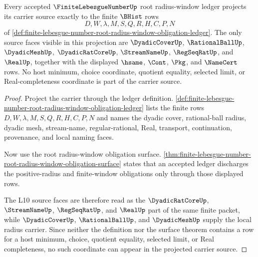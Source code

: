 \begin{theorem}
\label{thm:finite-lebesgue-number-radius-carrier-source}
Every accepted $\FiniteLebesgueNumberUp$ root radius-window ledger projects its carrier source exactly to the finite $\BHist$ rows
$$
D,W,\lambda,M,S,Q,R,H,C,P,N
$$
of \autoref{def:finite-lebesgue-number-root-radius-window-obligation-ledger}. The only source faces visible in this projection are $\DyadicCoverUp$, $\RationalBallUp$, $\DyadicMeshUp$, $\DyadicRatCoreUp$, $\StreamNameUp$, $\RegSeqRatUp$, and $\RealUp$, together with the displayed $\hsame$, $\Cont$, $\Pkg$, and $\NameCert$ rows. No host minimum, choice coordinate, quotient equality, selected limit, or Real-completeness coordinate is part of the carrier source.
\end{theorem}
\begin{proof}
Project the carrier through the ledger definition. \autoref{def:finite-lebesgue-number-root-radius-window-obligation-ledger} lists the finite rows $D,W,\lambda,M,S,Q,R,H,C,P,N$ and names the dyadic cover, rational-ball radius, dyadic mesh, stream-name, regular-rational, Real, transport, continuation, provenance, and local naming faces.

Now use the root radius-window obligation surface. \autoref{thm:finite-lebesgue-number-root-radius-window-obligation-surface} states that an accepted ledger discharges the positive-radius and finite-window obligations only through those displayed rows.

The L10 source faces are therefore read as the $\DyadicRatCoreUp$, $\StreamNameUp$, $\RegSeqRatUp$, and $\RealUp$ part of the same finite packet, while $\DyadicCoverUp$, $\RationalBallUp$, and $\DyadicMeshUp$ supply the local radius carrier. Since neither the definition nor the surface theorem contains a row for a host minimum, choice, quotient equality, selected limit, or Real completeness, no such coordinate can appear in the projected carrier source.
\end{proof}

